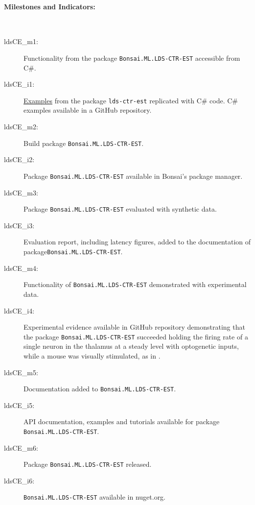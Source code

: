 \paragraph{Milestones and Indicators:}\mbox{}\\

\begin{description}

    \item[ldsCE\_m1:] Functionality from the package
        \texttt{Bonsai.ML.LDS-CTR-EST} accessible from C\#.

    \item[ldsCE\_i1:] \href{https://cloctools.github.io/lds-ctrl-est/docs/api/examples/}{Examples}
        from the package \texttt{lds-ctr-est} replicated with C\# code.
        C\# examples available in a GitHub repository.

    \item[ldsCE\_m2:] Build package \texttt{Bonsai.ML.LDS-CTR-EST}.

    \item[ldsCE\_i2:] Package \texttt{Bonsai.ML.LDS-CTR-EST} available in
        Bonsai's package manager.

    \item[ldsCE\_m3:] Package \texttt{Bonsai.ML.LDS-CTR-EST}
        evaluated with synthetic data.

    \item[ldsCE\_i3:] Evaluation report, including latency figures, added to
        the documentation of package\linebreak\texttt{Bonsai.ML.LDS-CTR-EST}.

    \item[ldsCE\_m4:] Functionality of \texttt{Bonsai.ML.LDS-CTR-EST} demonstrated
        with experimental data.

    \item[ldsCE\_i4:] Experimental evidence available in GitHub repository
        demonstrating that the package\linebreak
        \texttt{Bonsai.ML.LDS-CTR-EST} succeeded holding the firing rate of a
        single neuron in the thalamus at a steady level with optogenetic
        inputs, while a mouse was visually stimulated, as in
        \citet{bolusEtAl21}.

    \item[ldsCE\_m5:] Documentation added to \texttt{Bonsai.ML.LDS-CTR-EST}.

    \item[ldsCE\_i5:] API documentation, examples and tutorials available for
        package \texttt{Bonsai.ML.LDS-CTR-EST}.

    \item[ldsCE\_m6:] Package \texttt{Bonsai.ML.LDS-CTR-EST} released.

    \item[ldsCE\_i6:] \texttt{Bonsai.ML.LDS-CTR-EST} available in nuget.org.

\end{description}

